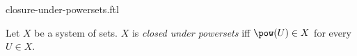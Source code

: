\documentclass{naproche-library}
\begin{document}
\begin{smodule}[title=Closure Under Powersets]{closure-under-powersets.ftl}

\begin{definition}[forthel,id=FOUNDATIONS_14_4652013578120594]
  Let $X$ be a system of sets.
  $X$ is \emph{closed under powersets} iff $\pow(U) \in X$ for every $U \in X$.
\end{definition}
\end{smodule}
\end{document}
